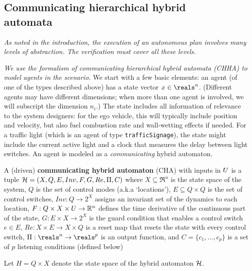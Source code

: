 \subsection{Communicating hierarchical hybrid \\automata}
\label{HCHA}
{\it As noted in the introduction, the execution of an autonomous plan involves many levels of abstraction. The verification must cover all these levels.}

{\it We use the formalism of communicating hierarchical hybrid automata (CHHA) to model agents in the scenario. }
We start with a few basic elements:
an agent (of one of the types described above) has a state vector $x \in \reals^n$.
(Different agents may have different dimensions; when more than one agent is involved, we will subscript the dimension $n_i$.)
The state includes all information of relevance to the system designers: for the ego vehicle, this will typically include position and velocity, but also fuel combustion rate and wall-wetting effects if needed.
For a traffic light (which is an agent of type \texttt{trafficSignage}), the state might include the current active light and a clock that measures the delay between light switches.
An agent is modeled as a \emph{communicating} hybrid automaton.

\begin{defn}
A (driven) \textbf{communicating hybrid automaton} (CHA) with inputs in $U$ 
is a tuple $\mathcal{H} = (X, Q, E, Inv, F, G, Re, \Pi, C)$
where $X \subseteq \Re^n$ is the state space of the system, 
$Q$ is the set of control modes (a.k.a `locations'), 
$E \subseteq Q \times Q$ is the set of control switches, 
$Inv : Q \rightarrow 2^X$ assigns an invariant set of the dynamics to each location, 
$F : Q \times X \times U \rightarrow \mathbb{R}^n$ defines the time derivative of the continuous part of the state, 
$G : E \times X \rightarrow 2^X$ is the guard condition that enables a control switch $e \in E$,
$Re : X \times E \rightarrow X \times Q$ is a reset map that resets the state with every control switch,
$\funcOut: \reals^n \rightarrow \reals^p$ is an output function,
and $C = \{c_1,\ldots,c_p\}$ is a set of $p$ listening conditions (defined below)
  
Let $H = Q \times X$ denote the state space of the hybrid automaton $\mathcal{H}$.
	\end{defn}
	
